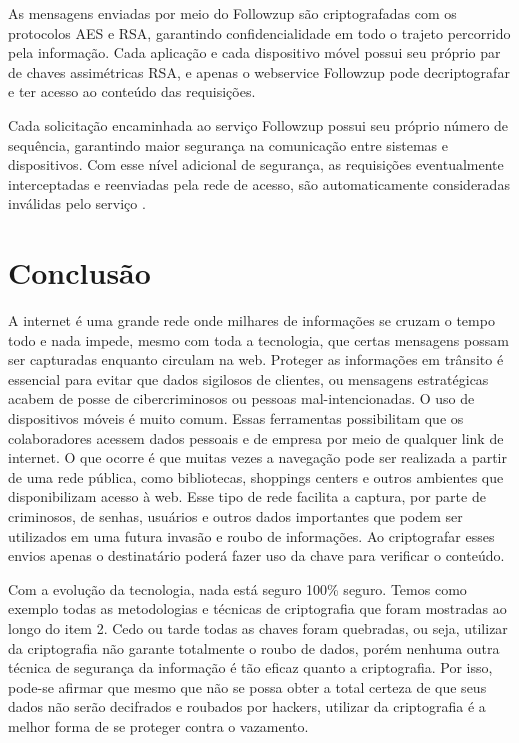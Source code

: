 \documentclass[12pt]{article}
\begin{document}
As mensagens enviadas por meio do Followzup são criptografadas com os protocolos AES e RSA, garantindo confidencialidade em todo o trajeto percorrido pela informação. Cada aplicação e cada dispositivo móvel possui seu próprio par de chaves assimétricas RSA, e apenas o webservice Followzup pode decriptografar e ter acesso ao conteúdo das requisições.


Cada solicitação encaminhada ao serviço Followzup possui seu próprio número de sequência, garantindo maior segurança na comunicação entre sistemas e dispositivos. Com esse nível adicional de segurança, as requisições eventualmente interceptadas e reenviadas pela rede de acesso, são automaticamente consideradas inválidas pelo serviço \cite{followzup}.


\section{Conclusão}

A internet é uma grande rede onde milhares de informações se cruzam o tempo todo e nada impede, mesmo com toda a tecnologia, que certas mensagens possam ser capturadas enquanto circulam na web. Proteger as informações em trânsito é essencial para evitar que dados sigilosos de clientes, ou mensagens estratégicas acabem de posse de cibercriminosos ou pessoas mal-intencionadas.  O uso de dispositivos móveis é muito comum. Essas ferramentas possibilitam que os colaboradores acessem dados pessoais e de empresa por meio de qualquer link de internet. O que ocorre é que muitas vezes a navegação pode ser realizada a partir de uma rede pública, como bibliotecas, shoppings centers e outros ambientes que disponibilizam acesso à web. Esse tipo de rede facilita a captura, por parte de criminosos, de senhas, usuários e outros dados importantes que podem ser utilizados em uma futura invasão e roubo de informações. Ao criptografar esses envios apenas o destinatário poderá fazer uso da chave para verificar o conteúdo.


Com a evolução da tecnologia, nada está seguro 100\% seguro. Temos como exemplo todas as metodologias e técnicas de criptografia que foram mostradas ao longo do item 2. Cedo ou tarde todas as chaves foram quebradas, ou seja, utilizar da criptografia não garante totalmente o roubo de dados, porém nenhuma outra técnica de segurança da informação é tão eficaz quanto a criptografia. Por isso, pode-se afirmar que mesmo que não se possa obter a total certeza de que seus dados não serão decifrados e roubados por hackers, utilizar da criptografia é a melhor forma de se proteger contra o vazamento.




\end{document}
